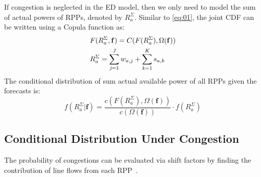 If congestion is neglected in the ED model, then we only need to model the sum of actual powers of RPPs, denoted by $R_a^{\Sigma}$.
Similar to \eqref{eq:01}, the joint CDF can be written using a Copula function as:
\setcounter{equation}{5}
\begin{equation} \label{eq:3}
\begin{split}
& F(R_{a}^{\Sigma},\mathbf{f})=C(F(R_{a}^{\Sigma}),\Omega(\mathbf{f}))\\
& R_{a}^{\Sigma}=\sum _{{\it j}={1}}^{{\it J}}w_{a,j}+\sum _{{\it k}={1}}^{{\it K}}s_{a,k} \\
\end{split}
\end{equation}
The conditional distribution of sum actual available power of all RPPs given the forecasts is:
\begin{equation} \label{sumdistribution}
f(R_{a}^{\Sigma}|\mathbf{f})= \frac{c(F(R_{a}^{\Sigma}),\Omega(\mathbf{f}))}{c(\Omega(\mathbf{f}))}\cdot   f(R_{a}^{\Sigma})
\end{equation}

\subsection {Conditional Distribution Under Congestion}
The probability of congestions can be evaluated via {shift factors} by finding the contribution of line flows from each RPP~\cite{li2013dynamic}.

